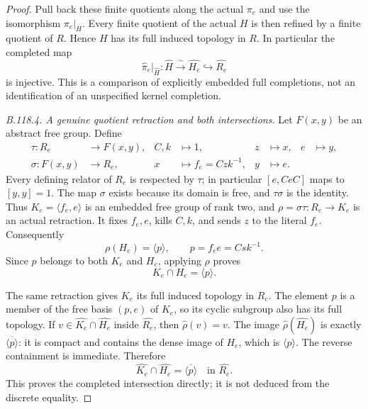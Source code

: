 \begin{proof}
Pull back these finite quotients along the actual $\pi_e$ and use
the isomorphism $\pi_e|_H$. Every finite quotient of the actual $H$
is then refined by a finite quotient of $R$. Hence $H$ has its full
induced topology in $R$. In particular the completed map
\begin{equation}\label{eq:B118-completed-base-map}
 \widehat\pi_e|_{\widehat H}:
       \widehat H\xrightarrow{\ \sim\ }\widehat{H_e}
          \hookrightarrow\widehat{R_e}
\end{equation}
is injective. This is a comparison of explicitly embedded full
completions, not an identification of an unspecified kernel completion.

\emph{B.118.4. A genuine quotient retraction and both intersections.}
Let $F(x,y)$ be an abstract free group. Define
\begin{equation}\label{eq:B118-quotient-retraction}
 \begin{aligned}
 \tau:R_e&\longrightarrow F(x,y),
   &C,k&\longmapsto1,&z&\longmapsto x,&e&\longmapsto y,\\
 \sigma:F(x,y)&\longrightarrow R_e,
   &x&\longmapsto f_e=Czk^{-1},&y&\longmapsto e.
 \end{aligned}
\end{equation}
Every defining relator of $R_e$ is respected by $\tau$; in
particular $[e,CeC]$ maps to $[y,y]=1$. The map $\sigma$ exists
because its domain is free, and $\tau\sigma$ is the identity.
Thus $K_e=\langle f_e,e\rangle$ is an embedded free group of rank
two, and $\rho=\sigma\tau:R_e\to K_e$ is an actual retraction.
It fixes $f_e,e$, kills $C,k$, and sends $z$ to the literal $f_e$.
Consequently
\begin{equation}\label{eq:B118-retraction-image}
 \rho(H_e)=\langle p\rangle,\qquad p=f_e e=Csk^{-1}.
\end{equation}
Since $p$ belongs to both $K_e$ and $H_e$, applying $\rho$ proves
\[
 K_e\cap H_e=\langle p\rangle.
\]

The same retraction gives $K_e$ its full induced topology in $R_e$.
The element $p$ is a member of the free basis $(p,e)$ of $K_e$,
so its cyclic subgroup also has its full topology. If
$v\in\widehat{K_e}\cap\widehat{H_e}$ inside $\widehat{R_e}$,
then $\widehat\rho(v)=v$. The image
$\widehat\rho(\widehat{H_e})$ is exactly
$\overline{\langle p\rangle}$: it is compact and contains the
dense image of $H_e$, which is $\langle p\rangle$.
The reverse containment is immediate. Therefore
\begin{equation}\label{eq:B118-quotient-completed-intersection}
 \widehat{K_e}\cap\widehat{H_e}
       =\overline{\langle p\rangle}\quad\text{in }\widehat{R_e}.
\end{equation}
This proves the completed intersection directly; it is not deduced
from the discrete equality.


\end{proof}
